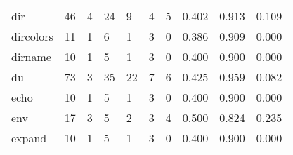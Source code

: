 \begin{longtable}{lp{2.0cm}p{2.0cm}p{2.0cm}p{2.0cm}p{2.0cm}p{2.0cm}p{2.0cm}p{2.0cm}p{2.0cm}}
dir       &                     46 &                                             4 &                                           24 &                                           9 &                                            4 &                                          5 &                                0.402 &                                  0.913 &                                0.109 \\
dircolors &                     11 &                                             1 &                                            6 &                                           1 &                                            3 &                                          0 &                                0.386 &                                  0.909 &                                0.000 \\
dirname   &                     10 &                                             1 &                                            5 &                                           1 &                                            3 &                                          0 &                                0.400 &                                  0.900 &                                0.000 \\
du        &                     73 &                                             3 &                                           35 &                                          22 &                                            7 &                                          6 &                                0.425 &                                  0.959 &                                0.082 \\
echo      &                     10 &                                             1 &                                            5 &                                           1 &                                            3 &                                          0 &                                0.400 &                                  0.900 &                                0.000 \\
env       &                     17 &                                             3 &                                            5 &                                           2 &                                            3 &                                          4 &                                0.500 &                                  0.824 &                                0.235 \\
expand    &                     10 &                                             1 &                                            5 &                                           1 &                                            3 &                                          0 &                                0.400 &                                  0.900 &                                0.000 \\

\end{longtable}
